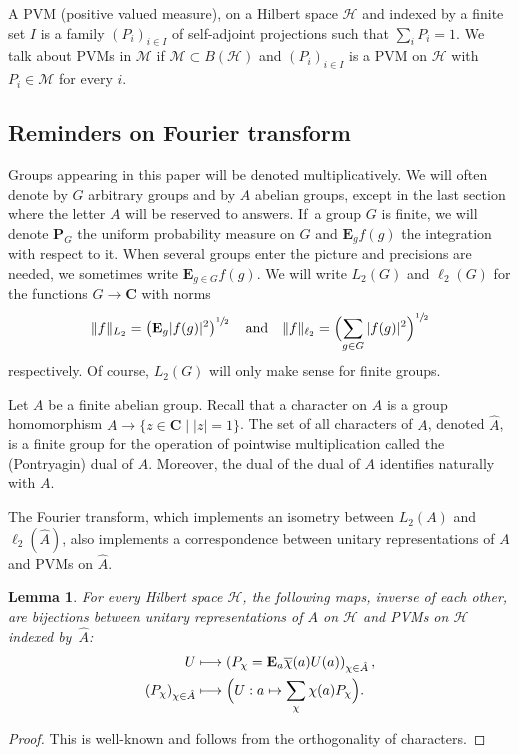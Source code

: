 \documentclass[10pt]{amsart}
\newcommand\mto{\mathchoice{\longmapsto}{\mapsto}{\mapsto}{\mapsto}}
\theoremstyle{plain}
\newtheorem{lemma}[theorem]{Lemma}
\theoremstyle{definition}
\newcommand{\C}{\mathbf{C}}
\newcommand{\cM}{\mathcal{M}}
\newcommand{\E}{\mathbf{E}}
\newcommand{\cH}{\mathcal{H}}
\newcommand{\prob}{\mathbf{P}}
\begin{document}
A PVM (positive valued measure), on a Hilbert space $\cH$ and indexed by a finite set $I$ is a family $(P_i)_{i\in I}$ of self-adjoint projections such that $\sum_i P_i=1$. We talk about PVMs in $\cM$ if $\cM\subset B(\cH)$ and $(P_i)_{i \in I}$ is a PVM on $\cH$ with $P_i \in \cM$ for every $i$.

\subsection{Reminders on Fourier transform}
Groups appearing in this paper will be denoted multiplicatively. We will often denote by $G$ arbitrary groups and by $A$ abelian groups, except in the last section where the letter $A$ will be reserved to answers. If~a group $G$ is finite, we will denote $\prob_G$ the uniform probability measure on $G$ and $\E_g f(g)$ the integration with respect to it. When several groups enter the picture and precisions are needed, we sometimes write $\E_{g \in G} f(g)$. We will write $L_2(G)$ and $\ell_2(G)$ for the functions $G \to \C$ with norms
\[
\|f\|_{L_2} = \left(\E_g |f(g)|^2\right)^{\sfrac 1 2}\quad\text{and}\quad\|f\|_{\ell_2} = \Bigl(\sum_{g \in G} |f(g)|^2\Bigr)^{\sfrac 1 2}
\]
respectively. Of course, $L_2(G)$ will only make sense for finite groups.

Let $A$ be a finite abelian group. Recall that a character on $A$ is a group homomorphism $A \to \{z \in \C \mid |z|=1\}$. The set of all characters of $A$, denoted $\hat A$, is a finite group for the operation of pointwise multiplication called the (Pontryagin) dual of $A$. Moreover, the dual of the dual of $A$ identifies naturally with $A$.

The Fourier transform, which implements an isometry between $L_2(A)$ and $\ell_2(\hat A)$, also implements a correspondence between unitary representations of $A$ and PVMs on $\hat A$.
\begin{lemma}\label{lem:Fourier_abelian_group} For every Hilbert space $\cH$, the following maps, inverse of each other, are bijections between unitary representations of $A$ on $\cH$ and PVMs on $\cH$ indexed by~$\hat A$:
\begin{align*}
U &\mto \left(P_\chi = \E_a \overline{\chi}(a) U(a)\right)_{\chi \in \hat A},
\\
(P_\chi)_{\chi \in \hat A} &\mto \Bigl( U: a \mapsto \sum_\chi \chi(a) P_\chi\Bigr).
\end{align*}
\end{lemma}
\begin{proof} This is well-known and follows from the orthogonality of characters.
\end{proof}
\end{document}
